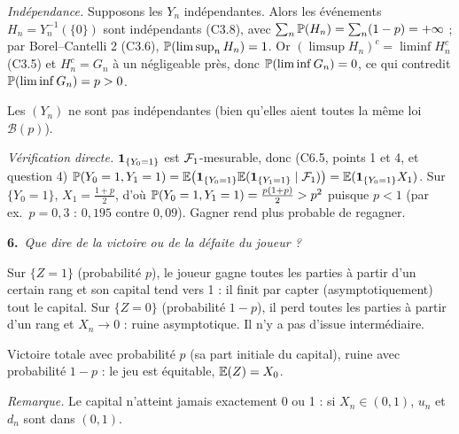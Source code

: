 \documentclass[11pt,a4paper]{article}
\newcommand{\question}[2]{\par\medskip\noindent\textbf{#1}~\textit{#2}\par\smallskip}
\begin{document}
\begin{exo}
\emph{Indépendance.} Supposons les $Y_n$ indépendantes. Alors les événements $H_n=Y_n^{-1}(\{0\})$ sont indépendants (C3.8), avec
$\sum_n\mathbb{P}(H_n)=\sum_n(1-p)=+\infty$ ; par Borel--Cantelli 2 (C3.6), $\mathbb{P}(\limsup_nH_n)=1$. Or $(\limsup H_n)^c=\liminf H_n^c$ (C3.5) et
$H_n^c=G_n$ à un négligeable près, donc $\mathbb{P}(\liminf G_n)=0$, ce qui contredit $\mathbb{P}(\liminf G_n)=p>0$.
\begin{resultat}Les $(Y_n)$ ne sont pas indépendantes (bien qu'elles aient toutes la même loi $\mathcal B(p)$).\end{resultat}
\textit{Vérification directe.} $\mathbf{1}_{\{Y_0=1\}}$ est $\mathcal{F}_1$-mesurable, donc (C6.5, points 1 et 4, et question 4)
$\mathbb{P}(Y_0=1,Y_1=1)=\mathbb{E}\bigl(\mathbf{1}_{\{Y_0=1\}}\mathbb{E}(\mathbf{1}_{\{Y_1=1\}}\mid\mathcal{F}_1)\bigr)=\mathbb{E}(\mathbf{1}_{\{Y_0=1\}}X_1)$. Sur $\{Y_0=1\}$, $X_1=\frac{1+p}2$, d'où
$\mathbb{P}(Y_0=1,Y_1=1)=\frac{p(1+p)}2>p^2$ puisque $p<1$ (par ex.\ $p=0{,}3$ : $0{,}195$ contre $0{,}09$). Gagner rend plus probable de regagner.

\question{6.}{Que dire de la victoire ou de la défaite du joueur ?}
Sur $\{Z=1\}$ (probabilité $p$), le joueur gagne toutes les parties à partir d'un certain rang et son capital tend vers 1 : il finit par
capter (asymptotiquement) tout le capital. Sur $\{Z=0\}$ (probabilité $1-p$), il perd toutes les parties à partir d'un rang et
$X_n\to0$ : ruine asymptotique. Il n'y a pas d'issue intermédiaire.
\begin{resultat}Victoire totale avec probabilité $p$ (sa part initiale du capital), ruine avec probabilité $1-p$ : le jeu est équitable,
$\mathbb{E}(Z)=X_0$.\end{resultat}
\textit{Remarque.} Le capital n'atteint jamais exactement 0 ou 1 : si $X_n\in(0,1)$, $u_n$ et $d_n$ sont dans $(0,1)$.
\end{exo}
\end{document}
